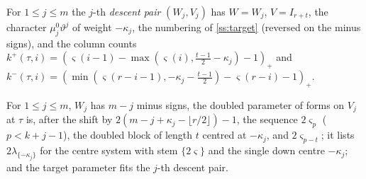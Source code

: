 For $1\le j\le m$ the $j$-th \emph{descent pair} $(W_j,V_j)$ has $W=W_j$, $V=I_{r+t}$, the character
$\mu^0_j\vartheta^j$ of weight $-\kappa_j$, the numbering of \cref{ss:target} (reversed on the minus signs), and
the column counts $k^+(\tau,i)=(\varsigma(i-1)-\max(\varsigma(i),\frac{t-1}2-\kappa_j)-1)_+$ and
$k^-(\tau,i)=(\min(\varsigma(r-i-1),-\kappa_j-\frac{t-1}2)-\varsigma(r-i)-1)_+$.

\begin{proposition}\label{prop:descent-pair-fits}
For $1\le j\le m$, $W_j$ has $m-j$ minus signs, the doubled parameter of forms on $V_j$ at $\tau$ is, after the
shift by $2(m-j+\kappa_j-\lfloor r/2\rfloor)-1$, the sequence $2\varsigma_p$ ($p<k+j-1$), the doubled block of length
$t$ centred at $-\kappa_j$, and $2\varsigma_{p-t}$; it lists $2\lambda_{\{-\kappa_j\}}$ for the centre system with
stem $\{2\varsigma\}$ and the single down centre $-\kappa_j$; and the target parameter fits the $j$-th descent pair.
\end{proposition}

